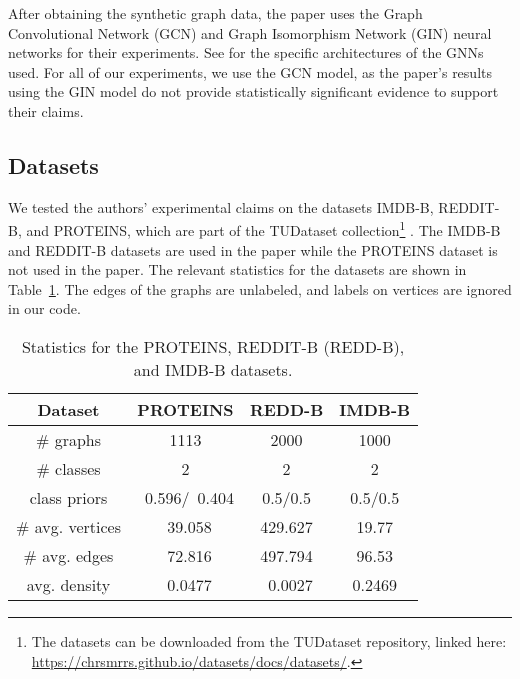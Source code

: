 After obtaining the synthetic graph data, the paper uses the Graph Convolutional Network (GCN) \cite{Kipf:2017} and Graph Isomorphism Network (GIN) \cite{Xu:2019} neural networks for their experiments. See \cite[AF.2]{Han:2022} for the specific architectures of the GNNs used. For all of our experiments, we use the GCN model, as the paper's results using the GIN model do not provide statistically significant evidence to support their claims.


\subsection{Datasets}
We tested the authors' experimental claims on the datasets IMDB-B, REDDIT-B, and PROTEINS, which are part of the TUDataset collection\footnote{The datasets can be downloaded from the TUDataset repository, linked here: \href{https://chrsmrrs.github.io/datasets/docs/datasets/}{https://chrsmrrs.github.io/datasets/docs/datasets/}.} \cite{Morris:2020}. The IMDB-B and REDDIT-B datasets are used in the paper while the PROTEINS dataset is not used in the paper. The relevant statistics for the datasets are shown in Table~\ref{tab:data-stats}. The edges of the graphs are unlabeled, and labels on vertices are ignored in our code.

\begin{table}[h]
    \centering
    \begin{tabular}{c|ccc}
        Dataset & PROTEINS & REDD-B & IMDB-B \\
        \hline
        \# graphs & 1113 & 2000 & 1000\\
        \# classes & 2 & 2 & 2\\
        class priors & ~0.596/~0.404 & 0.5/0.5 & 0.5/0.5 \\
        \# avg. vertices & ~39.058 & 429.627 & 19.77\\
        \# avg. edges & ~72.816 & 497.794 & 96.53\\
        avg. density & ~0.0477 & ~0.0027 & 0.2469
    \end{tabular}
    \caption{Statistics for the PROTEINS, REDDIT-B (REDD-B), and IMDB-B datasets.}
    \label{tab:data-stats}
\end{table}

\vspace{1em}

